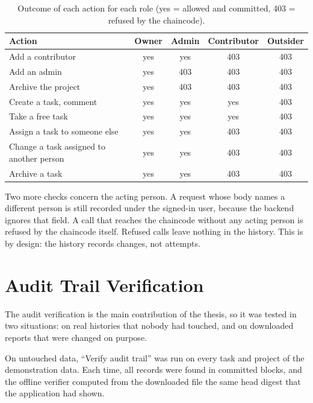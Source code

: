\begin{table}[htbp]
    \centering
    \small
    \begin{tabular}{p{4.6cm}cccc}
        \toprule
        Action & Owner & Admin & Contributor & Outsider \\
        \midrule
        Add a contributor & yes & yes & 403 & 403 \\
        Add an admin & yes & 403 & 403 & 403 \\
        Archive the project & yes & 403 & 403 & 403 \\
        Create a task, comment & yes & yes & yes & 403 \\
        Take a free task & yes & yes & yes & 403 \\
        Assign a task to someone else & yes & yes & 403 & 403 \\
        Change a task assigned to another person & yes & yes & 403 & 403 \\
        Archive a task & yes & yes & 403 & 403 \\
        \bottomrule
    \end{tabular}
    \caption{Outcome of each action for each role (yes = allowed and committed, 403 = refused by the chaincode).}
    \label{tab:perm-results}
\end{table}

Two more checks concern the acting person. A request whose body names a different person is still recorded under the signed-in user, because the backend ignores that field. A call that reaches the chaincode without any acting person is refused by the chaincode itself. Refused calls leave nothing in the history. This is by design: the history records changes, not attempts.

\section{Audit Trail Verification}
\label{sec:results-audit}

The audit verification is the main contribution of the thesis, so it was tested in two situations: on real histories that nobody had touched, and on downloaded reports that were changed on purpose.

On untouched data, ``Verify audit trail'' was run on every task and project of the demonstration data. Each time, all records were found in committed blocks, and the offline verifier computed from the downloaded file the same head digest that the application had shown.

